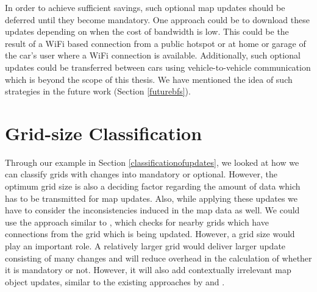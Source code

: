 In order to achieve sufficient savings, such optional map updates should be deferred until they become mandatory. One approach could be to download these updates depending on when the cost of bandwidth is low. This could be the result of a WiFi based connection from a public hotspot or at home or garage of the car's user where a WiFi connection is available. Additionally, such optional updates could be transferred between cars using vehicle-to-vehicle communication which is beyond the scope of this thesis. We have mentioned the idea of such strategies in the future work (Section \ref{futurebfs}).
\section{Grid-size Classification} \label{gridsizeclassification}
Through our example in Section \ref{classificationofupdates}, we looked at how we can classify grids with changes into mandatory or optional. However, the optimum grid size is also a deciding factor regarding the amount of data which has to be transmitted for map updates. Also, while applying these updates we have to consider the inconsistencies induced in the map data as well. We could use the approach similar to \citet{asahara2008locally}, which checks for nearby grids which have connections from the grid which is being updated. However, a grid size would play an important role. A relatively larger grid would deliver larger update consisting of many changes and will reduce overhead in the calculation of whether it is mandatory or not. However, it will also add contextually irrelevant map object updates, similar to the existing approaches by \cite{min2011system} and \cite{bastiaensen2003actmap}. \\

